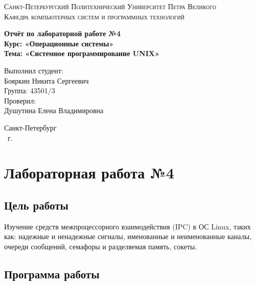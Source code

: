 \documentclass[14pt,a4paper,report]{report}
\begin{document}
\def\contentsname{Содержание}

\begin{titlepage}
	\begin{center}
		\textsc{Санкт-Петербургский Политехнический 
			Университет Петра Великого\\[5mm]
			Кафедра компьютерных систем и программных технологий}
		
		\vfill
		
		\textbf{Отчёт по лабораторной работе №4\\[3mm]
			Курс: «Операционные системы»\\[6mm]
			Тема: «Системное программирование UNIX»\\[35mm]
		}
	\end{center}
	
	\hfill
	\begin{minipage}{.5\textwidth}
		Выполнил студент:\\[2mm] 
		Бояркин Никита Сергеевич\\
		Группа: 43501/3\\[5mm]
		
		Проверил:\\[2mm] 
		Душутина Елена Владимировна
	\end{minipage}
	\vfill
	\begin{center}
		Санкт-Петербург\\ \the\year\ г.
	\end{center}
\end{titlepage}

\tableofcontents
\clearpage

\chapter{Лабораторная работа №4}

\section{Цель работы}

Изучение средств межпроцессорного взаимодействия (IPC) в ОС Linux, таких как: надежные и ненадежные сигналы, именованные и неименованные  каналы, очереди сообщений, семафоры и разделяемая память, сокеты.

\section{Программа работы}
\end{document}
